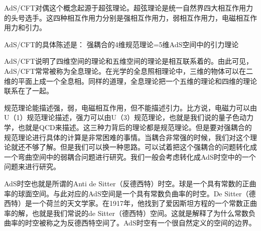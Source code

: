 
AdS/CFT对偶这个概念起源于超弦理论。超弦理论是统一自然界四大相互作用力的头号选手。这四种相互作用力分别是强相互作用力，弱相互作用力，电磁相互作用力和引力。

AdS/CFT的具体陈述是：
强耦合的4维规范理论=5维AdS空间中的引力理论

AdS/CFT说明了四维空间的理论和五维空间的理论是相互联系着的。由此可见，AdS/CFT常常被称为全息理论。在光学的全息照相理论中，三维的物体可以在二维的平面上成一个全息相。同样的道理，全息理论把一个五维的理论和四维的理论联系在了一起。

规范理论能描述强，弱，电磁相互作用，但不能描述引力。比方说，电磁力可以由U（1）规范理论描述，强力可以由U（3）规范理论，也就是我们说的量子色动力学，也就是QCD来描述。这三种力背后的理论都是规范理论。但是要对强耦合的规范理论进行具体的计算是非常困难的事情。当耦合非常强的时候，我们对这个理论就还不够了解。但是我们可以换一种思路。可以试着把这个强耦合的问题转化成一个弯曲空间中的弱耦合问题进行研究。我们一般会考虑转化成AdS时空中的一个问题来进行研究。

AdS时空也就是所谓的Anti de Sitter（反德西特）时空。球是一个具有常数的正曲率的球面空间。与此对应的AdS空间是一个具有常数负曲率的时空。De Sitter（德西特）是一个荷兰的天文学家。在1917年，他找到了爱因斯坦方程的一个常数正曲率的解，也就是我们常说的de Sitter（德西特）空间。这就是解释了为什么常数负曲率的时空被称之为反德西特空间了。AdS时空有一个很自然定义的空间的边界。